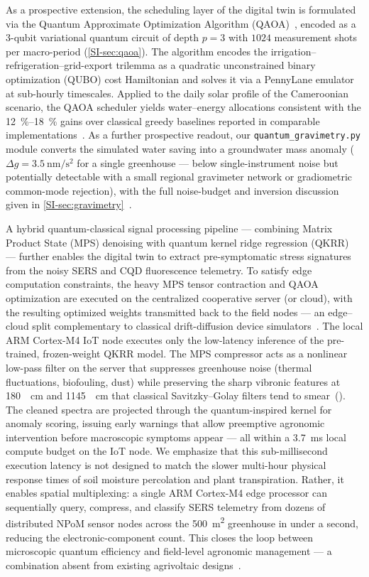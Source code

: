 \documentclass[preprint,12pt]{elsarticle}
\begin{document}
As a prospective extension, the scheduling layer of the digital twin is formulated via the Quantum Approximate Optimization Algorithm (QAOA)~\cite{Farhi2014,AlSagri2025}, encoded as a 3-qubit variational quantum circuit of depth $p=3$ with $1024$ measurement shots per macro-period (\cref{SI-sec:qaoa}). The algorithm encodes the irrigation--refrigeration--grid-export trilemma as a quadratic unconstrained binary optimization (QUBO) cost Hamiltonian and solves it via a PennyLane emulator at sub-hourly timescales. Applied to the daily solar profile of the Cameroonian scenario, the QAOA scheduler yields water--energy allocations consistent with the \qtyrange{12}{18}{\percent} gains over classical greedy baselines reported in comparable implementations~\cite{AlSagri2025}. As a further prospective readout, our \texttt{quantum\_gravimetry.py} module converts the simulated water saving into a groundwater mass anomaly ($\Delta g = \qty{3.5}{\nm\per\s\squared}$ for a single greenhouse --- below single-instrument noise but potentially detectable with a small regional gravimeter network or gradiometric common-mode rejection), with the full noise-budget and inversion discussion given in \cref{SI-sec:gravimetry}~\cite{Stray2022,Menoret2018}.

A hybrid quantum-classical signal processing pipeline --- combining Matrix Product State (MPS) denoising with quantum kernel ridge regression (QKRR)~\cite{Stoudenmire2016,Havlicek2019} --- further enables the digital twin to extract pre-symptomatic stress signatures from the noisy SERS and CQD fluorescence telemetry. To satisfy edge computation constraints, the heavy MPS tensor contraction and QAOA optimization are executed on the centralized cooperative server (or cloud), with the resulting optimized weights transmitted back to the field nodes --- an edge--cloud split complementary to classical drift-diffusion device simulators~\cite{DuYan2026}. The local ARM Cortex-M4 IoT node executes only the low-latency inference of the pre-trained, frozen-weight QKRR model. The MPS compressor acts as a nonlinear low-pass filter on the server that suppresses greenhouse noise (thermal fluctuations, biofouling, dust) while preserving the sharp vibronic features at \qty{180}{\per\cm} and \qty{1145}{\per\cm} that classical Savitzky--Golay filters tend to smear~(). The cleaned spectra are projected through the quantum-inspired kernel for anomaly scoring, issuing early warnings that allow preemptive agronomic intervention before macroscopic symptoms appear --- all within a \qty{3.7}{\milli\second} local compute budget on the IoT node. We emphasize that this sub-millisecond execution latency is not designed to match the slower multi-hour physical response times of soil moisture percolation and plant transpiration. Rather, it enables spatial multiplexing: a single ARM Cortex-M4 edge processor can sequentially query, compress, and classify SERS telemetry from dozens of distributed NPoM sensor nodes across the \qty{500}{\m\squared} greenhouse in under a second, reducing the electronic-component count.
This closes the loop between microscopic quantum efficiency and field-level agronomic management --- a combination absent from existing agrivoltaic designs~\cite{Ringstrom2026,Thompson2020,Dupraz2011}.
\end{document}
